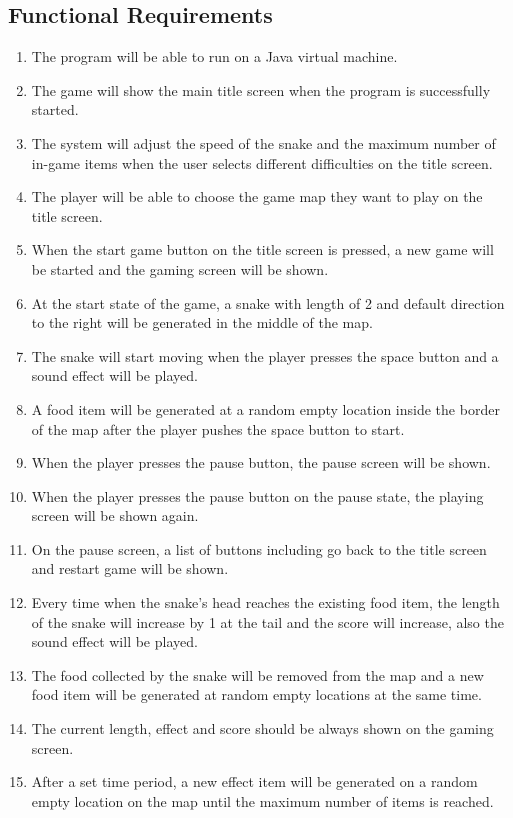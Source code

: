 \documentclass[12pt, titlepage]{article}
\begin{document}
\subsection{Functional Requirements}
\begin{enumerate}[{FR}1.]
    \item The program will be able to run on a Java virtual machine.
    \item The game will show the main title screen when the program is successfully started.
    \item The system will adjust the speed of the snake and the maximum number of in-game items when the user selects different difficulties on the title screen.
    \item The player will be able to choose the game map they want to play on the title screen.
    \item When the start game button on the title screen is pressed, a new game will be started and the gaming screen will be shown.
    \item At the start state of the game, a snake with length of 2 and default direction to the right will be generated in the middle of the map.
    \item The snake will start moving when the player presses the space button and a sound effect will be played.
    \item A food item will be generated at a random empty location inside the border of the map after the player pushes the space button to start.
    \item When the player presses the pause button, the pause screen will be shown.
    \item When the player presses the pause button on the pause state, the playing screen will be shown again.
    \item On the pause screen, a list of buttons including go back to the title screen and restart game will be shown.
    \item Every time when the snake's head reaches the existing food item, the length of the snake will increase by 1 at the tail and the score will increase, also the sound effect will be played.
    \item The food collected by the snake will be removed from the map and a new food item will be generated at random empty locations at the same time.
    \item The current length, effect and score should be always shown on the gaming screen.
    \item After a set time period, a new effect item will be generated on a random empty location on the map until the maximum number of items is reached.

\end{enumerate}
\end{document}
